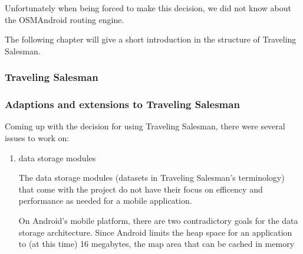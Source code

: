 Unfortunately when being forced to make this decision, we did not know about the OSMAndroid routing engine.\newline

The following chapter will give a short introduction in the structure of Traveling Salesman.

\subsubsection{Traveling Salesman}


\subsubsection{Adaptions and extensions to Traveling Salesman}

Coming up with the decision for using Traveling Salesman, there were several issues to work on:

\begin{enumerate}
	\item data storage modules
	
		The data storage modules (datasets in Traveling Salesman's terminology) that come with the project do not have their focus on efficency and performance as needed for a mobile application.
		
		On Android's mobile platform, there are two contradictory goals for the data storage architecture. Since Android limits the heap space for an application to (at this time) 16 megabytes, the map area that can be cached in memory 

\end{enumerate}
